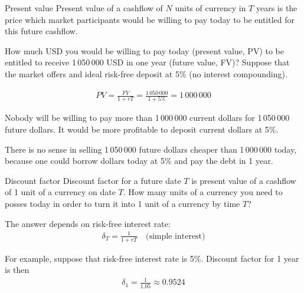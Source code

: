 \documentclass{beamer}
\begin{document}
\begin{frame}{Present value}
\justify
\alert{Present value} of a cashflow of $N$ units of currency in $T$ years is the price which market participants would be willing to pay today to be entitled for this future cashflow.

\justify
How much USD you would be willing to pay today (present value, PV) to be entitled to receive 1\,050\,000 USD in one year (future value, FV)? Suppose that the market offers and ideal risk-free deposit at 5\% (no interest compounding).

\begin{align*}
PV = \frac{FV}{1+rT} = \frac{1\,050\,000}{1 + 5\%} = 1\,000\,000
\end{align*}

\justify
Nobody will be willing to pay more than 1\,000\,000 current dollars for 1\,050\,000 future dollars. It would be more profitable to deposit current dollars at 5\%.

\justify
There is no sense in selling 1\,050\,000 future dollars cheaper than 1\,000\,000 today, because one could borrow dollars today at 5\% and pay the debt in 1 year.
\end{frame}



\begin{frame}{Discount factor}
\justify
\alert{Discount factor} for a future date $T$ is present value of a cashflow of 1 unit of a currency on date $T$. How many units of a currency you need to posses today in order to turn it into 1 unit of a currency by time $T$?

\justify
The answer depends on risk-free interest rate:
\begin{align*}
\delta_T = \frac{1}{1 + rT} \quad \text{(simple interest)}
\end{align*}

\justify
For example, suppose that risk-free interest rate is 5\%.  Discount factor for 1 year is then
\begin{align*}
\delta_1 = \frac{1}{1.05} \approx 0.9524
\end{align*}
\end{frame}
\end{document}
